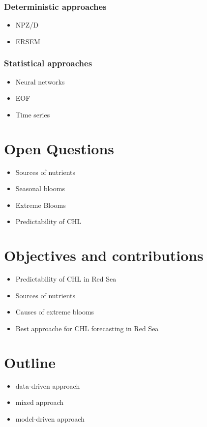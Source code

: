 		\subsubsection{Deterministic approaches}

			\begin{itemize}
				\item NPZ/D
				\item ERSEM
			\end{itemize}

		\subsubsection{Statistical approaches}

			\begin{itemize}
				\item Neural networks
				\item EOF
				\item Time series
			\end{itemize}

\section{Open Questions}
\label{intro:questions}

	\begin{itemize}
		\item Sources of nutrients
		\item Seasonal blooms
		\item Extreme Blooms
		\item Predictability of CHL
	\end{itemize}

\section{Objectives and contributions}
\label{intro:objectives}

	\begin{itemize}
		\item Predictability of CHL in Red Sea
		\item Sources of nutrients
		\item Causes of extreme blooms
		\item Best approache for CHL forecasting in Red Sea
	\end{itemize}

\section{Outline}
\label{intro:outline}

	\begin{itemize}
		\item data-driven approach
		\item mixed approach
		\item model-driven approach
	\end{itemize}
